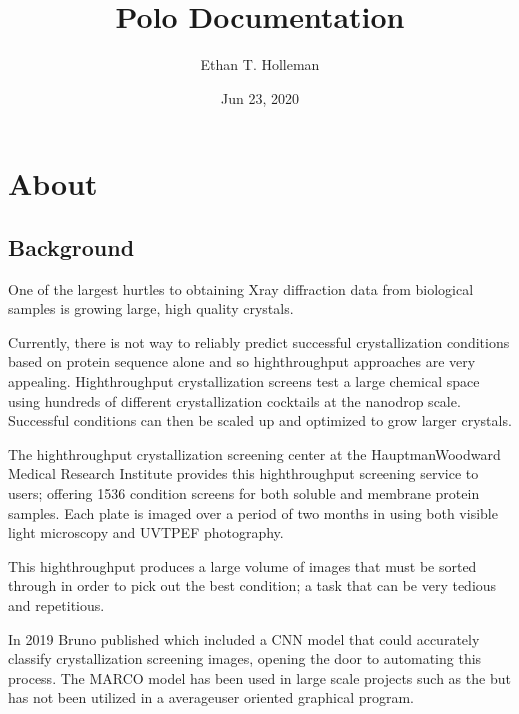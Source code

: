 \documentclass[letterpaper,10pt,english]{sphinxmanual}
\title{Polo Documentation}
\date{Jun 23, 2020}
\author{Ethan T. Holleman}
\begin{document}
\pagestyle{empty}
\sphinxmaketitle
\pagestyle{plain}
\sphinxtableofcontents
\pagestyle{normal}
\label{\detokenize{index::doc}}



\chapter{About}
\label{\detokenize{about:about}}\label{\detokenize{about::doc}}

\section{Background}
\label{\detokenize{about:background}}
One of the largest hurtles to obtaining X\sphinxhyphen{}ray diffraction
data from biological samples is growing large, high quality crystals.

Currently, there is not way to reliably predict successful crystallization
conditions based on protein sequence alone and so high\sphinxhyphen{}throughput approaches
are very appealing. High\sphinxhyphen{}throughput crystallization screens test a large
chemical space using hundreds of different crystallization cocktails at the
nano\sphinxhyphen{}drop scale. Successful conditions can then be scaled up and optimized to
grow larger crystals.

The high\sphinxhyphen{}throughput crystallization screening center at the Hauptman\sphinxhyphen{}Woodward
Medical Research Institute provides this high\sphinxhyphen{}throughput screening service to
users; offering 1536 condition screens for both soluble and membrane protein
samples. Each plate is imaged over a period of two months in using both
visible light microscopy and UV\sphinxhyphen{}TPEF photography.

This high\sphinxhyphen{}throughput produces a large volume of images that must be
sorted through in order to pick out the best condition; a task that can be
very tedious and repetitious.

In 2019 Bruno  published 
which included a CNN model that could accurately classify crystallization screening
images, opening the door to automating this process. The MARCO model has been
used in large scale projects such as the 
but has not been utilized in a average\sphinxhyphen{}user oriented graphical program.
\end{document}
